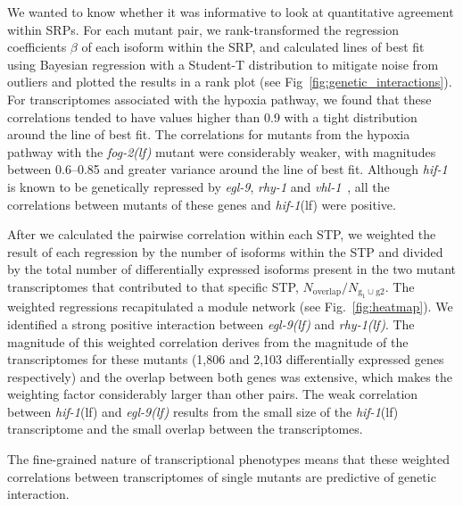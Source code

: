 \documentclass[10pt, onecolumn]{article}
\newcommand{\gene}[1]{\emph{#1}}
\newcommand{\fog}{\emph{\mbox{fog-2(lf)}}}
\newcommand{\egl}{\emph{\mbox{egl-9}(lf)}}
\newcommand{\rhy}{\emph{\mbox{rhy-1}(lf)}}
\newcommand{\hif}{\emph{\mbox{hif-1}}(lf)}
\newcommand{\egln}{1,806}
\newcommand{\rhyn}{2,103}
\begin{document}
We wanted to know whether it was informative to look at quantitative agreement
within SRPs. For each mutant pair, we rank-transformed
the regression coefficients $\beta$ of each isoform within the SRP, and
calculated lines of best fit using Bayesian regression with a Student-T
distribution to mitigate noise from outliers and plotted the results in a rank plot
(see Fig~\ref{fig:genetic_interactions}). For transcriptomes associated with the
hypoxia pathway, we found that these correlations tended to have
values higher than 0.9 with a tight distribution around the line of best fit.
The correlations for mutants from the hypoxia pathway
with the \fog{} mutant were considerably weaker, with magnitudes between
0.6--0.85 and greater variance around the line of best fit.
Although \gene{hif-1} is known to be genetically repressed by \gene{egl-9}, \gene{rhy-1} and
\gene{vhl-1}~\cite{Epstein2001,Shen2006}, all the correlations
between mutants of these genes and \hif{} were positive.

After we calculated the pairwise correlation within each STP,
we weighted the result of each regression by the
number of isoforms within the STP and
divided by the total number of differentially expressed isoforms present in the
two mutant transcriptomes that contributed to that specific STP,
$N_\mathrm{overlap}/N_{\mathrm{g_1} \cup \mathrm{g2}}$.
The weighted regressions recapitulated a module network (see Fig.~\ref{fig:heatmap}).
We identified a strong positive interaction between \egl{} and \rhy{}.
The magnitude of this weighted correlation derives from the magnitude of the
transcriptomes for these mutants (\egln{} and \rhyn{} differentially expressed
genes respectively) and the overlap between both genes was
extensive, which makes the weighting factor considerably larger than other pairs.
The weak correlation between \hif{} and \egl{} results from the small size of
the \hif{} transcriptome and the small overlap between the transcriptomes.

The fine-grained nature of transcriptional phenotypes means that these weighted
correlations between transcriptomes of single mutants are predictive of genetic
interaction.
\end{document}
